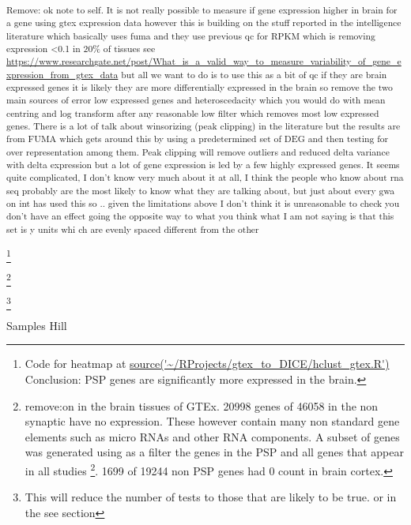   
\textsubscript{Remove: ok note to self. It is not really possible to measure if gene expression higher in brain for a gene using gtex expression data however this is building on the stuff reported in the intelligence literature which basically uses fuma and they use previous qc for RPKM which is removing expression <0.1 in 20\% of tissues see \url{https://www.researchgate.net/post/What_is_a_valid_way_to_measure_variability_of_gene_expression_from_gtex_data} but all we want to do is to use this as a bit of qc if they are brain expressed genes it is likely they are more differentially expressed in the brain so remove the two main sources of error low expressed genes and heteroscedacity which you would do with mean centring and log transform after any reasonable low filter which removes most low expressed genes. There is a lot of talk about winsorizing (peak clipping) in the literature but the results are from FUMA which gets around this by using a predetermined set of DEG and then testing for over representation among them. Peak clipping will remove outliers and reduced delta variance with delta expression but a lot of gene expression is led by a few highly expressed genes. It seems quite complicated, I don't know very much about it at all, I think the people who know about rna seq probably are the most likely to know what they are talking about, but just about every gwa on int has used this so .. given the limitations above I don't think it is unreasonable to check you don't have an effect going the opposite way to what you think what I am not saying is that this set is y units whi
ch are evenly spaced different from the other}

\footnote{Code for heatmap at \url{source('~/RProjects/gtex_to_DICE/hclust_gtex.R')}
Conclusion: PSP genes are significantly more expressed in the brain. }


\footnote{remove:on in the brain tissues of GTEx. 20998 genes of 46058 in the non synaptic have no expression. These however contain many non standard gene elements such as micro RNAs and other RNA components. A subset of genes was generated using as a filter the genes in the PSP and all genes that appear in all studies  \footnote{\textcolor{red}{may want to change this to any study and will need to change graph again}}. 1699 of 19244 non PSP genes had 0 count in brain cortex.}

\footnote{This will reduce the number of tests to those that are likely to be true. 
or in the see section}

Samples Hill

